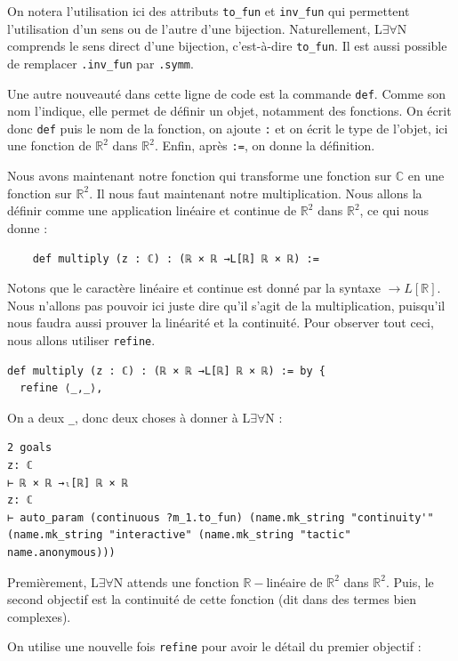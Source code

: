 \documentclass[a4paper, 11pt, twoside]{report}
\newcommand\R{\mathbb{R}}
\newcommand\C{\mathbb{C}}
\newcommand{\LEAN}{L$\exists\forall$N }
\begin{document}
On notera l'utilisation ici des attributs \verb|to_fun| et \verb|inv_fun| qui permettent l'utilisation d'un sens ou de l'autre d'une bijection. Naturellement, \LEAN comprends le sens direct d'une bijection, c'est-à-dire \verb|to_fun|. Il est aussi possible de remplacer \verb|.inv_fun| par \verb|.symm|.

Une autre nouveauté dans cette ligne de code est la commande \verb|def|. Comme son nom l'indique, elle permet de définir un objet, notamment des fonctions. On écrit donc \verb|def| puis le nom de la fonction, on ajoute \verb|:| et on écrit le type de l'objet, ici une fonction de $\R^2$ dans $\R^2$. Enfin, après \verb|:=|, on donne la définition.

\medskip

Nous avons maintenant notre fonction qui transforme une fonction sur $\C$ en une fonction sur $\R^2$. Il nous faut maintenant notre multiplication. Nous allons la définir comme une application linéaire et continue de $\R^2$ dans $\R^2$, ce qui nous donne :

\begin{lstlisting}
	def multiply (z : ℂ) : (ℝ × ℝ →L[ℝ] ℝ × ℝ) := 
\end{lstlisting}

Notons que le caractère linéaire et continue est donné par la syntaxe $\rightarrow L[\R]$. Nous n'allons pas pouvoir ici juste dire qu'il s'agit de la multiplication, puisqu'il nous faudra aussi prouver la linéarité et la continuité. Pour observer tout ceci, nous allons utiliser \verb|refine|.
	
\begin{lstlisting}
def multiply (z : ℂ) : (ℝ × ℝ →L[ℝ] ℝ × ℝ) := by {
  refine ⟨_,_⟩, 
\end{lstlisting}
  
  On a deux \verb|_|, donc deux choses à donner à \LEAN :
  
\begin{lstlisting}
2 goals
z: ℂ
⊢ ℝ × ℝ →ₗ[ℝ] ℝ × ℝ
z: ℂ
⊢ auto_param (continuous ?m_1.to_fun) (name.mk_string "continuity'" (name.mk_string "interactive" (name.mk_string "tactic" name.anonymous)))
\end{lstlisting}

Premièrement, \LEAN attends une fonction $\R-$linéaire de $\R^2$ dans $\R^2$. Puis, le second objectif est la continuité de cette fonction (dit dans des termes bien complexes). 

On utilise une nouvelle fois \verb|refine| pour avoir le détail du premier objectif :
\end{document}
